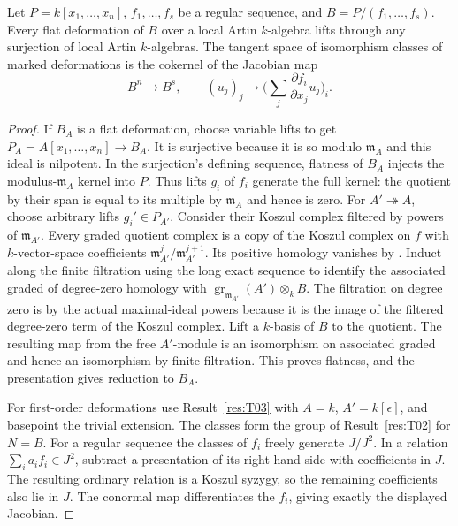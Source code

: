 \begin{theorem}\label{res:T04}
Let \(P=k[x_1,\ldots,x_n]\), \(f_1,\ldots,f_s\) be a regular
sequence, and \(B=P/(f_1,\ldots,f_s)\).
Every flat deformation of \(B\) over a local Artin \(k\)-algebra
lifts through any surjection of local Artin \(k\)-algebras.
The tangent space of isomorphism classes of marked deformations
is the cokernel of the Jacobian map
\[
 B^n \longrightarrow B^s,\qquad
 (u_j)_j\longmapsto
 \Big(\sum_j \frac{\partial f_i}{\partial x_j}u_j\Big)_i .
\]
\end{theorem}
\begin{proof}
If \(B_A\) is a flat deformation, choose variable lifts to get
\(P_A=A[x_1,\ldots,x_n]\to B_A\). It is surjective because it is
so modulo \(\mathfrak m_A\) and this ideal is nilpotent. In the
surjection's defining sequence, flatness of \(B_A\) injects
the modulus-\(\mathfrak m_A\) kernel into \(P\).
Thus lifts \(g_i\) of \(f_i\) generate the full kernel:
the quotient by their span is equal to its multiple by
\(\mathfrak m_A\) and hence is zero. For \(A'\twoheadrightarrow A\),
choose arbitrary lifts \(g_i'\in P_{A'}\). Consider their Koszul
complex filtered by powers of \(\mathfrak m_{A'}\).
Every graded quotient complex is a copy of the Koszul complex on
\(f\) with \(k\)-vector-space coefficients \(\mathfrak m_{A'}^j/
\mathfrak m_{A'}^{j+1}\). Its positive homology vanishes by
\cite[RK-07]{core}. Induct along the finite filtration using the
long exact sequence to identify the associated graded of degree-zero
homology with
\(\operatorname{gr}_{\mathfrak m_{A'}}(A')\otimes_k B\).
The filtration on degree zero is by the actual maximal-ideal powers
because it is the image of the filtered degree-zero term of the
Koszul complex. Lift a \(k\)-basis of \(B\) to the quotient.
The resulting map from the free \(A'\)-module is an isomorphism
on associated graded and hence an isomorphism by finite filtration.
This proves flatness, and the presentation gives reduction to \(B_A\).

For first-order deformations use Result~\ref{res:T03} with
\(A=k\), \(A'=k[\epsilon]\), and basepoint the trivial extension.
The classes form the group of Result~\ref{res:T02} for \(N=B\).
For a regular sequence the classes of \(f_i\) freely generate
\(J/J^2\). In a relation \(\sum_i a_i f_i\in J^2\), subtract
a presentation of its right hand side with coefficients in \(J\).
The resulting ordinary relation is a Koszul syzygy, so the remaining
coefficients also lie in \(J\).
The conormal map differentiates the \(f_i\), giving exactly
the displayed Jacobian.
\end{proof}

